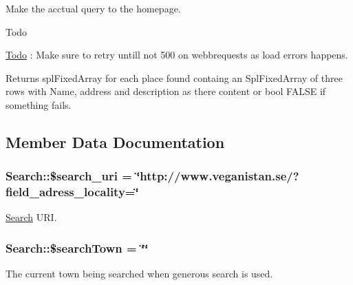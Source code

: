 Make the acctual query to the homepage. 

\begin{DoxyRefDesc}{Todo}
\item[\hyperlink{todo__todo000001}{Todo}]\+: Make sure to retry untill not 500 on webbrequests as load errors happens.\end{DoxyRefDesc}


\begin{DoxyReturn}{Returns}
spl\+Fixed\+Array for each place found containg an Spl\+Fixed\+Array of three rows with Name, address and description as there content or bool F\+A\+L\+S\+E if something fails. 
\end{DoxyReturn}


\subsection{Member Data Documentation}
\hypertarget{class_search_adbc71d7a9ff28a661af822ca70dfeefa}{}
\subsubsection[{\$search\+\_\+uri}]{\setlength{\rightskip}{0pt plus 5cm}Search\+::\$search\+\_\+uri = \char`\"{}http\+://www.\+veganistan.\+se/?field\+\_\+adress\+\_\+locality=\char`\"{}\hspace{0.3cm}{\ttfamily [protected]}}\label{class_search_adbc71d7a9ff28a661af822ca70dfeefa}


\hyperlink{class_search}{Search} U\+R\+I. 

\hypertarget{class_search_a0bdf2816de59f8db308bc03285152358}{}
\subsubsection[{\$search\+Town}]{\setlength{\rightskip}{0pt plus 5cm}Search\+::\$search\+Town = \char`\"{}\char`\"{}\hspace{0.3cm}{\ttfamily [protected]}}\label{class_search_a0bdf2816de59f8db308bc03285152358}


The current town being searched when generous search is used. 

\hypertarget{class_search_ad5a555c9913e06e21914adb4d9fc36d6}{}
